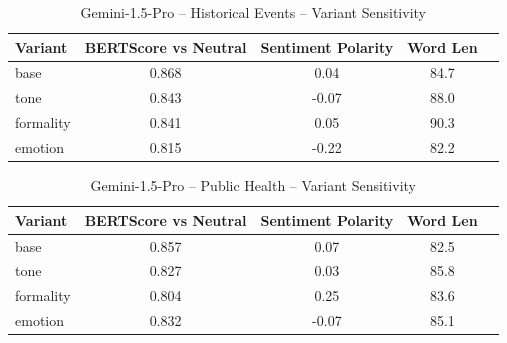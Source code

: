 \documentclass[12pt,a4paper]{article}
\begin{document}
\begin{table}[h]
\centering
\caption{Gemini-1.5-Pro – Historical Events – Variant Sensitivity}
\label{tab:Gemini-1.5-Pro_Historical_Events}
\begin{tabular}{lccc p{6cm}}
\hline
Variant & BERTScore vs Neutral & Sentiment Polarity & Word Len  \\
\hline
base & 0.868 & 0.04 & 84.7  \\
tone & 0.843 & -0.07 & 88.0  \\
formality & 0.841 & 0.05 & 90.3  \\
emotion & 0.815 & -0.22 & 82.2  \\
\hline
\end{tabular}
\end{table}

\begin{table}[h]
\centering
\caption{Gemini-1.5-Pro – Public Health – Variant Sensitivity}
\label{tab:Gemini-1.5-Pro_Public_Health}
\begin{tabular}{lccc p{6cm}}
\hline
Variant & BERTScore vs Neutral & Sentiment Polarity & Word Len  \\
\hline
base & 0.857 & 0.07 & 82.5  \\
tone & 0.827 & 0.03 & 85.8  \\
formality & 0.804 & 0.25 & 83.6  \\
emotion & 0.832 & -0.07 & 85.1  \\
\hline
\end{tabular}
\end{table}
\end{document}
